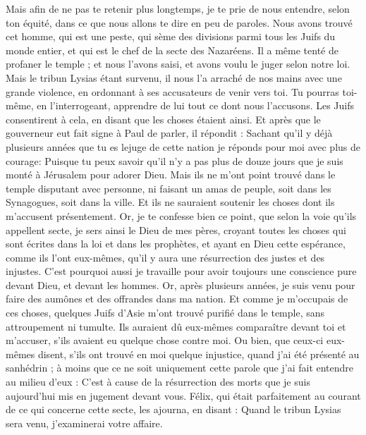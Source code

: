 \begin{multicols}{2}
Mais afin de ne pas te retenir plus longtemps, je te prie de nous entendre, selon ton équité, dans ce que nous allons te dire en peu de paroles.
Nous avons trouvé cet homme, qui est une peste, qui sème des divisions parmi tous les Juifs du monde entier, et qui est le chef de la secte des Nazaréens.
Il a même tenté de profaner le temple ; et nous l'avons saisi, et avons voulu le juger selon notre loi.
Mais le tribun Lysias étant survenu, il nous l'a arraché de nos mains avec une grande violence,
en ordonnant à ses accusateurs de venir vers toi. Tu pourras toi-même, en l'interrogeant, apprendre de lui tout ce dont nous l'accusons.
Les Juifs consentirent à cela, en disant que les choses étaient ainsi.
Et après que le gouverneur eut fait signe à Paul de parler, il répondit : Sachant qu'il y déjà plusieurs années que tu es lejuge de cette nation je réponds pour moi avec plus de courage:
Puisque tu peux savoir qu'il n'y a pas plus de douze jours que je suis monté à Jérusalem pour adorer Dieu.
Mais ils ne m'ont point trouvé dans le temple disputant avec personne, ni faisant un amas de peuple, soit dans les Synagogues, soit dans la ville. 
Et ils ne sauraient soutenir les choses dont ils m'accusent présentement.
Or, je te confesse bien ce point, que selon la voie qu'ils appellent secte, je sers ainsi le Dieu de mes pères, croyant toutes les choses qui sont écrites dans la loi et dans les prophètes,
et ayant en Dieu cette espérance, comme ils l'ont eux-mêmes, qu'il y aura une résurrection des justes et des injustes.
C'est pourquoi aussi je travaille pour avoir toujours une conscience pure devant Dieu, et devant les hommes.
Or, après plusieurs années, je suis venu pour faire des aumônes et des offrandes dans ma nation.
Et comme je m'occupais de ces choses, quelques Juifs d'Asie m'ont trouvé purifié dans le temple, sans attroupement ni tumulte.
Ils auraient dû eux-mêmes comparaître devant toi et m'accuser, s'ils avaient eu quelque chose contre moi.
Ou bien, que ceux-ci eux-mêmes disent, s'ils ont trouvé en moi quelque injustice, quand j'ai été présenté au sanhédrin ;
à moins que ce ne soit uniquement cette parole que j'ai fait entendre au milieu d'eux : C'est à cause de la résurrection des morts que je suis aujourd'hui mis en jugement devant vous.
Félix, qui était parfaitement au courant de ce qui concerne cette secte, les ajourna, en disant : Quand le tribun Lysias sera venu, j'examinerai votre affaire.

\end{multicols}
